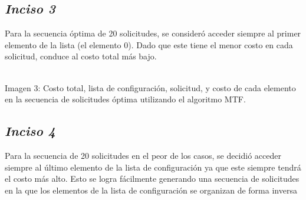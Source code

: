 \subsection*{\textit{\textbf{Inciso 3}}}

Para la secuencia óptima de 20 solicitudes, se consideró acceder siempre al primer elemento de la lista (el elemento 0). Dado que este tiene el menor costo en cada solicitud, conduce al costo total más bajo.\\

\begin{center}
\\
\vspace{0.02in}
\small\textcolor{FSBlue}{Imagen 3: Costo total, lista de configuración, solicitud, y costo de cada elemento en la secuencia de solicitudes óptima utilizando el algoritmo MTF.}
\end{center}

\subsection*{\textit{\textbf{Inciso 4}}}

Para la secuencia de 20 solicitudes en el peor de los casos, se decidió acceder siempre al último elemento de la lista de configuración ya que este siempre tendrá el costo más alto. Esto se logra fácilmente generando una secuencia de solicitudes en la que los elementos de la lista de configuración se organizan de forma inversa\\

